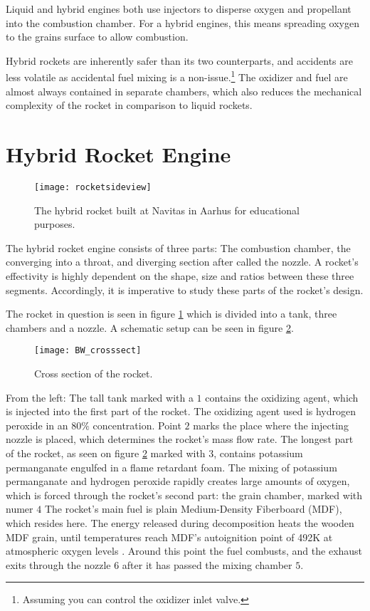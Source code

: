 	Liquid and hybrid engines both use injectors to disperse oxygen and propellant into the combustion chamber. For a hybrid engines, this means spreading oxygen to the grains surface to allow combustion.

	Hybrid rockets are inherently safer than its two counterparts, and accidents are less volatile as accidental fuel mixing is a non-issue.\footnote{Assuming you can control the oxidizer inlet valve.} The oxidizer and fuel are almost always contained in separate chambers, which also reduces the mechanical complexity of the rocket in comparison to liquid rockets.

\section{Hybrid Rocket Engine}

\begin{figure}
	\centering
	\texttt{[image: rocketsideview]}
	\caption{The hybrid rocket built at Navitas in Aarhus for educational purposes.}
	\label{fig:rocketpic}
\end{figure}

	The hybrid rocket engine consists of three parts: The combustion chamber, the converging into a throat, and diverging section after called the nozzle. A rocket's effectivity is highly dependent on the shape, size and ratios between these three segments. Accordingly, it is imperative to study these parts of the rocket's design.

	The rocket in question is seen in figure \ref{fig:rocketpic} which is divided into a tank, three chambers and a nozzle. A schematic setup can be seen in figure \ref{fig:crosssect}.

	\begin{figure}
		\texttt{[image: BW\_crosssect]}
		\caption{Cross section of the rocket.}
		\label{fig:crosssect}
	\end{figure}

	From the left: The tall tank marked with a $1$ contains the oxidizing agent, which is injected into the first part of the rocket. The oxidizing agent used is hydrogen peroxide in an $80\%$ concentration. Point $2$ marks the place where the injecting nozzle is placed, which determines the rocket's mass flow rate. The longest part of the rocket, as seen on figure \ref{fig:crosssect} marked with $3$, contains potassium permanganate engulfed in a flame retardant foam. The mixing of potassium permanganate and hydrogen peroxide rapidly creates large amounts of oxygen, which is forced through the rocket's second part: the grain chamber, marked with numer $4$ The rocket's main fuel is plain Medium-Density Fiberboard (MDF), which resides here. The energy released during decomposition heats the wooden MDF grain, until temperatures reach MDF's autoignition point of 492K at atmospheric oxygen levels \cite{mdfAIT}. Around this point the fuel combusts, and the exhaust exits through the nozzle $6$ after it has passed the mixing chamber $5$.

